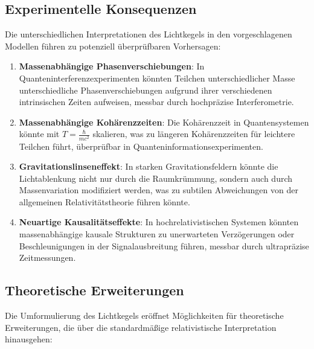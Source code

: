 \documentclass[a4paper,12pt]{article}
\begin{document}
			\subsection{Experimentelle Konsequenzen}
			Die unterschiedlichen Interpretationen des Lichtkegels in den vorgeschlagenen Modellen führen zu potenziell überprüfbaren Vorhersagen:
			
			\begin{enumerate}
			\item \textbf{Massenabhängige Phasenverschiebungen}: In Quanteninterferenzexperimenten könnten Teilchen unterschiedlicher Masse unterschiedliche Phasenverschiebungen aufgrund ihrer verschiedenen intrinsischen Zeiten aufweisen, messbar durch hochpräzise Interferometrie.
			\item \textbf{Massenabhängige Kohärenzzeiten}: Die Kohärenzzeit in Quantensystemen könnte mit \( T = \frac{\hbar}{m c^2} \) skalieren, was zu längeren Kohärenzzeiten für leichtere Teilchen führt, überprüfbar in Quanteninformationsexperimenten.
			\item \textbf{Gravitationslinseneffekt}: In starken Gravitationsfeldern könnte die Lichtablenkung nicht nur durch die Raumkrümmung, sondern auch durch Massenvariation modifiziert werden, was zu subtilen Abweichungen von der allgemeinen Relativitätstheorie führen könnte.
			\item \textbf{Neuartige Kausalitätseffekte}: In hochrelativistischen Systemen könnten massenabhängige kausale Strukturen zu unerwarteten Verzögerungen oder Beschleunigungen in der Signalausbreitung führen, messbar durch ultrapräzise Zeitmessungen.
			\end{enumerate}
			
			\subsection{Theoretische Erweiterungen}
			Die Umformulierung des Lichtkegels eröffnet Möglichkeiten für theoretische Erweiterungen, die über die standardmäßige relativistische Interpretation hinausgehen:
			
\end{document}
